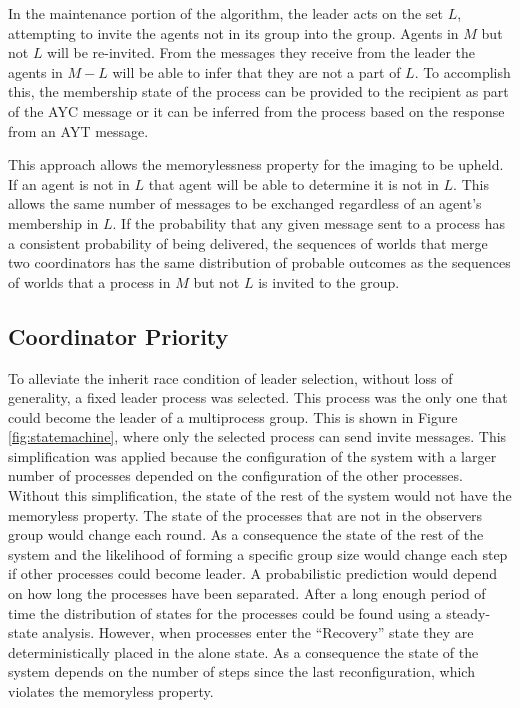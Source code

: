 In the maintenance portion of the algorithm, the leader acts on the set $L$, attempting to invite the agents not in its group into the group. Agents in $M$ but not $L$ will be re-invited. From the messages they receive from the leader the agents in $M-L$ will be able to infer that they are not a part of $L$. To accomplish this, the membership state of the process can be provided to the recipient as part of the \ac{AYC} message or it can be inferred from the process based on the response from an \ac{AYT} message.

This approach allows the memorylessness property for the imaging to be upheld. If an agent is not in $L$ that agent will be able to determine it is not in $L$. This allows the same number of messages to be exchanged regardless of an agent's membership in $L$. If the probability that any given message sent to a process has a consistent probability of being delivered, the sequences of worlds that merge two coordinators has the same distribution of probable outcomes as the sequences of worlds that a process in $M$ but not $L$ is invited to the group.

\subsection{Coordinator Priority}

To alleviate the inherit race condition of leader selection, without loss of generality, a fixed leader process was selected.
This process was the only one that could become the leader of a multiprocess group.
This is shown in Figure \ref{fig:statemachine}, where only the selected process can send invite messages.
This simplification was applied because the configuration of the system with a larger number of processes depended on the configuration of the other processes.
Without this simplification, the state of the rest of the system would not have the memoryless property.
The state of the processes that are not in the observers group would change each round.
As a consequence the state of the rest of the system and the likelihood of forming a specific group size would change each step if other processes could become leader.
A probabilistic prediction would depend on how long the processes have been separated.
After a long enough period of time the distribution of states for the processes could be found using a steady-state analysis.
However, when processes enter the ``Recovery'' state they are deterministically placed in the alone state.
As a consequence the state of the system depends on the number of steps since the last reconfiguration, which violates the memoryless property.

